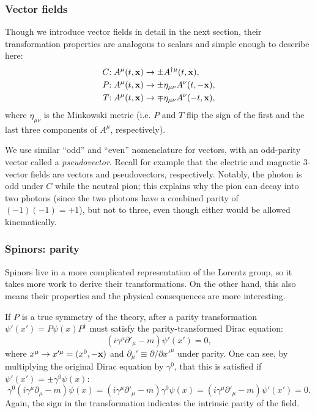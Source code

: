 \subsubsection{Vector fields}

Though we introduce vector fields in detail in the next section, their transformation properties are analogous to scalars and simple enough to describe here:
\begin{equation}
	\label{eq:01_qft_spinors_cpt_vectors}
	\begin{split}
		C\mathrm{:}\; A^\mu(t, \mathbf{x}) &\rightarrow \pm A^{\dagger\mu}(t, \mathbf{x}), \\
		P\mathrm{:}\; A^\mu(t, \mathbf{x}) &\rightarrow \pm \eta_{\mu\nu}A^\nu(t, -\mathbf{x}), \\
		T\mathrm{:}\; A^\mu(t, \mathbf{x}) &\rightarrow \mp \eta_{\mu\nu}A^\nu(-t, \mathbf{x}),
	\end{split}
\end{equation}
where $\eta_{\mu\nu}$ is the Minkowski metric (i.e. $P$ and $T$ flip the sign of the first and the last three components of $A^\mu$, respectively).

We use similar ``odd'' and ``even'' nomenclature for vectors, with an odd-parity vector called a \textit{pseudovector}.
Recall for example that the electric and magnetic $3$-vector fields are vectors and pseudovectors, respectively.
Notably, the photon is odd under $C$ while the neutral pion; this explains why the pion can decay into two photons (since the two photons have a combined parity of $(-1)(-1) = +1$), but not to three, even though either would be allowed kinematically.


\subsubsection{Spinors: parity}

Spinors live in a more complicated representation of the Lorentz group, so it takes more work to derive their transformations.
On the other hand, this also means their properties and the physical consequences are more interesting.

If $P$ is a true symmetry of the theory, after a parity transformation $\psi'(x') = P\psi(x)P^\dagger$ must satisfy the parity-transformed Dirac equation:
\begin{equation}
	\label{eq:01_qft_spinors_cpt_parity}
	(i\gamma^\mu\partial'_\mu - m)\psi'(x') = 0,
\end{equation}
where $x^\mu \rightarrow x'^\mu = (x^0, -\mathbf{x})$ and $\partial_\mu' \equiv \partial/\partial x'^\mu$ under parity.
One can see, by multiplying the original Dirac equation by $\gamma^0$, that this is satisfied if $\psi'(x') = \pm \gamma^0\psi(x)$:
\begin{equation}
	\label{eq:01_qft_spinors_cpt_parity2}
	\gamma^0(i\gamma^\mu\partial_\mu - m)\psi(x) = (i \gamma^\mu\partial'_\mu - m)\gamma^0\psi(x) = (i \gamma^\mu\partial'_\mu - m)\psi'(x') = 0.
\end{equation}
Again, the sign in the transformation indicates the intrinsic parity of the field.

